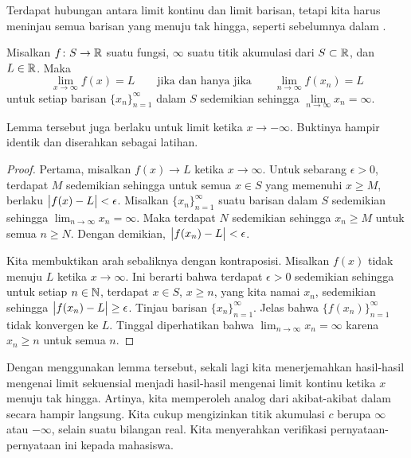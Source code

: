 Terdapat hubungan antara limit kontinu dan limit barisan, tetapi kita harus meninjau semua
barisan yang menuju tak hingga, seperti sebelumnya dalam .

\begin{lemma} \label{seqflimitinf:lemma}
Misalkan $f \colon S \to {\mathbb{R}}$ suatu fungsi, $\infty$ suatu titik
akumulasi dari $S \subset {\mathbb{R}}$, dan $L \in {\mathbb{R}}$.  Maka
\begin{equation*}
\lim_{x\to\infty} f(x) = L
\qquad \text{jika dan hanya jika} \qquad
\lim_{n\to\infty} f(x_n) = L
\end{equation*}
untuk setiap barisan $\{ x_n \}_{n=1}^\infty$ dalam $S$ sedemikian sehingga $\lim\limits_{n\to\infty} x_n = \infty$.
\end{lemma}

Lemma tersebut juga berlaku untuk limit ketika $x \to -\infty$.
Buktinya hampir identik dan
diserahkan sebagai latihan.

\begin{proof}
Pertama, misalkan $f(x) \to L$ ketika $x \to \infty$.
Untuk sebarang $\epsilon > 0$, terdapat $M$ sedemikian sehingga untuk semua $x \in S$
yang memenuhi $x \geq M$,
berlaku $\bigl\lvert {f(x)-L} \bigr\rvert < \epsilon$.
Misalkan $\{ x_n \}_{n=1}^\infty$
suatu barisan dalam $S$ sedemikian sehingga $\lim_{n\to\infty} x_n = \infty$.  Maka terdapat
$N$ sedemikian sehingga
$x_n \geq M$
untuk semua $n \geq N$.
Dengan demikian,
$\bigl\lvert {f(x_n)-L} \bigr\rvert < \epsilon$.

Kita membuktikan arah sebaliknya dengan kontraposisi.  Misalkan $f(x)$ tidak
menuju $L$ ketika $x \to \infty$.
Ini berarti bahwa terdapat $\epsilon > 0$
sedemikian sehingga untuk setiap $n \in {\mathbb{N}}$, terdapat $x \in S$, $x \geq n$, yang kita
namai $x_n$, sedemikian sehingga $\bigl\lvert {f(x_n)-L} \bigr\rvert \geq \epsilon$.
Tinjau barisan $\{ x_n \}_{n=1}^\infty$.  Jelas bahwa 
$\bigl\{ f(x_n) \bigr\}_{n=1}^\infty$ tidak konvergen ke $L$.  Tinggal diperhatikan
bahwa $\lim_{n\to\infty} x_n = \infty$ karena $x_n \geq n$ untuk semua $n$.
\end{proof}

Dengan menggunakan lemma tersebut, sekali lagi kita menerjemahkan hasil-hasil mengenai limit
sekuensial menjadi hasil-hasil mengenai limit kontinu ketika $x$ menuju tak hingga.  Artinya,
kita memperoleh analog dari akibat-akibat
dalam  secara hampir langsung.  Kita cukup mengizinkan 
titik akumulasi $c$ berupa $\infty$ atau $-\infty$, selain
suatu bilangan real.  Kita menyerahkan
verifikasi pernyataan-pernyataan ini kepada mahasiswa.

